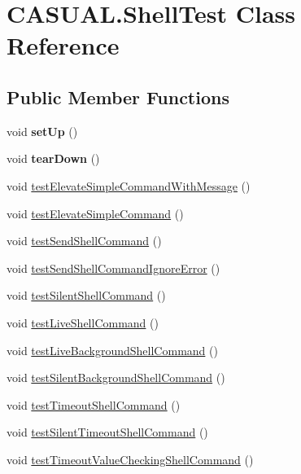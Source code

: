 \hypertarget{classCASUAL_1_1ShellTest}{\section{C\-A\-S\-U\-A\-L.\-Shell\-Test Class Reference}
\label{classCASUAL_1_1ShellTest}
}
\subsection*{Public Member Functions}
\begin{DoxyCompactItemize}
\item 
\hypertarget{classCASUAL_1_1ShellTest_a7b0f3b279accbaa32eba9cc6a83e0aa5}{void {\bfseries set\-Up} ()}\label{classCASUAL_1_1ShellTest_a7b0f3b279accbaa32eba9cc6a83e0aa5}

\item 
\hypertarget{classCASUAL_1_1ShellTest_ac0248062c8be157b9cf76f8e81f719cb}{void {\bfseries tear\-Down} ()}\label{classCASUAL_1_1ShellTest_ac0248062c8be157b9cf76f8e81f719cb}

\item 
void \hyperlink{classCASUAL_1_1ShellTest_ad4d35d96dcf733d63b63fb61751d59c9}{test\-Elevate\-Simple\-Command\-With\-Message} ()
\item 
void \hyperlink{classCASUAL_1_1ShellTest_ad4a1a5253daaa028680f982e556d08b4}{test\-Elevate\-Simple\-Command} ()
\item 
void \hyperlink{classCASUAL_1_1ShellTest_afa6d9d0b8f4ee681dc728bcc94bf78b9}{test\-Send\-Shell\-Command} ()
\item 
void \hyperlink{classCASUAL_1_1ShellTest_adf73783162e06a1eeb44770b755bbb2c}{test\-Send\-Shell\-Command\-Ignore\-Error} ()
\item 
void \hyperlink{classCASUAL_1_1ShellTest_a94fc5a0d1aa1bad2e14e43f9240d3a2c}{test\-Silent\-Shell\-Command} ()
\item 
void \hyperlink{classCASUAL_1_1ShellTest_a0cb22c494911e86073b2f45596154f7c}{test\-Live\-Shell\-Command} ()
\item 
void \hyperlink{classCASUAL_1_1ShellTest_ab764f470b46ab9cfe6c9811671aee47d}{test\-Live\-Background\-Shell\-Command} ()
\item 
void \hyperlink{classCASUAL_1_1ShellTest_a28e6a4cff00cf385a1eba5e073b2992e}{test\-Silent\-Background\-Shell\-Command} ()
\item 
void \hyperlink{classCASUAL_1_1ShellTest_a10ba3fe1b54a165637677c17fde188ba}{test\-Timeout\-Shell\-Command} ()
\item 
void \hyperlink{classCASUAL_1_1ShellTest_a297c2e2d65b7c997239b91cfb23d302b}{test\-Silent\-Timeout\-Shell\-Command} ()
\item 
void \hyperlink{classCASUAL_1_1ShellTest_af5c1b28fac5ae5de71a4cda18d2a9f07}{test\-Timeout\-Value\-Checking\-Shell\-Command} ()
\end{DoxyCompactItemize}
